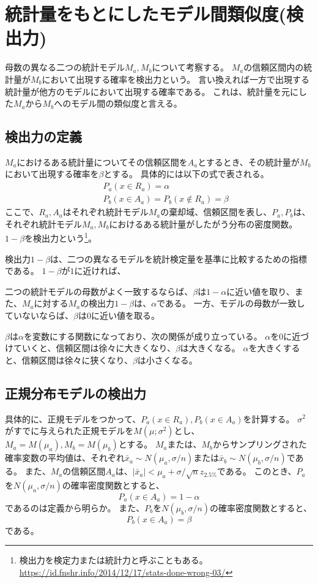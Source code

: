 \section{統計量をもとにしたモデル間類似度(検出力)}
母数の異なる二つの統計モデル$M_a,M_b$について考察する。
$M_a$の信頼区間内の統計量が$M_b$において出現する確率を検出力という。
言い換えれば一方で出現する統計量が他方のモデルにおいて出現する確率である。
これは、統計量を元にした$M_a$から$M_b$へのモデル間の類似度と言える。

\subsection{検出力の定義}
$M_a$におけるある統計量についてその信頼区間を$A_a$とするとき、その統計量が$M_b$において出現する確率を$\beta$とする。
具体的には以下の式で表される。
\begin{eqnarray*}
    & &P_a(x \in R_a) = \alpha\\
    & & P_b(x \in A_a) = P_b(x\notin R_a )=\beta
\end{eqnarray*}
ここで、$R_a,A_a$はそれぞれ統計モデル$M_a$の棄却域、信頼区間を表し、$P_a,P_b$は、それぞれ統計モデル$M_a,M_b$におけるある統計量がしたがう分布の密度関数。
$1-\beta$を検出力という\footnote{検出力を検定力または統計力と呼ぶこともある。\\ \url{https://id.fnshr.info/2014/12/17/stats-done-wrong-03/}}。


検出力$1-\beta$は、二つの異なるモデルを統計検定量を基準に比較するための指標である。
$1-\beta$が$1$に近ければ、

二つの統計モデルの母数がよく一致するならば、$\beta$は$1-\alpha$に近い値を取り、また、$M_a$に対する$M_a$の検出力$1-\beta$は、$\alpha$である。
一方、モデルの母数が一致していないならば、$\beta$は0に近い値を取る。

$\beta$は$\alpha$を変数にする関数になっており、次の関係が成り立っている。
$\alpha$を0に近づけていくと、信頼区間は徐々に大きくなり、$\beta$は大きくなる。
$\alpha$を大きくすると、信頼区間は徐々に狭くなり、$\beta$は小さくなる。



\subsection{正規分布モデルの検出力}
具体的に、正規モデルをつかって、$P_a(x \in R_a),P_b(x \in A_a)$を計算する。
$\sigma^2$がすでに与えられた正規モデルを$M(\mu;\sigma^2)$とし、$M_a=M(\mu_a),M_b=M(\mu_b)$とする。
$M_a$または、$M_b$からサンプリングされた確率変数の平均値は、それぞれ$\bar{x}_a\sim N(\mu_a,\sigma/n)$または$\bar{x}_b\sim N(\mu_b,\sigma/n)$である。
また、$M_a$の信頼区間$A_a$は、$|\bar{x}_a|<\mu_a+\sigma / \sqrt{n}z_{2.5\%}$である。
このとき、$P_a$を$N(\mu_a,\sigma/n)$の確率密度関数とすると、
\begin{equation*}
    P_a(x \in A_a) = 1-\alpha
\end{equation*}
であるのは定義から明らか。
また、$P_b$を$N(\mu_b,\sigma/n)$の確率密度関数とすると、
\begin{equation*}
    P_b(x \in A_a ) = \beta
\end{equation*}
である。


